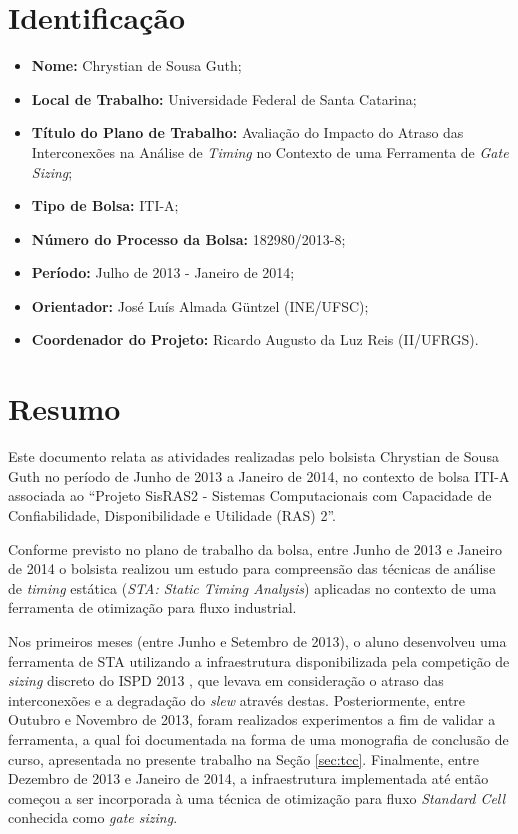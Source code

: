 \documentclass[
	12pt,				%
	openright,			%
	twoside,			%
	a4paper,			%
	english,			%
	french,				%
	spanish,			%
	brazil,				%
	]{abntex2}
\begin{document}
\section{Identificação}

\begin{itemize}
	\item \textbf{Nome:} Chrystian de Sousa Guth;
	\item \textbf{Local de Trabalho:} Universidade Federal de Santa Catarina;
	\item \textbf{Título do Plano de Trabalho:} Avaliação do Impacto do Atraso das Interconexões na Análise de \textit{Timing} no Contexto de uma Ferramenta de \textit{Gate Sizing};
	\item \textbf{Tipo de Bolsa:} ITI-A;
	\item \textbf{Número do Processo da Bolsa:} 182980/2013-8;
	\item \textbf{Período:} Julho de 2013 - Janeiro de 2014;
	\item \textbf{Orientador:} José Luís Almada Güntzel (INE/UFSC);
	\item \textbf{Coordenador do Projeto:} Ricardo Augusto da Luz Reis (II/UFRGS).
\end{itemize}

\section{Resumo}
Este documento relata as atividades realizadas pelo bolsista Chrystian de Sousa Guth no período de Junho de 2013 a Janeiro de 2014, no contexto de bolsa ITI-A associada ao ``Projeto SisRAS2 - Sistemas Computacionais com Capacidade de Confiabilidade, Disponibilidade e Utilidade (RAS) 2''.

Conforme previsto no plano de trabalho da bolsa, entre Junho de 2013 e Janeiro de 2014 o bolsista realizou um estudo para compreensão das técnicas de análise de \textit{timing} estática (\textit{STA: Static Timing Analysis}) aplicadas no contexto de uma ferramenta de otimização para fluxo industrial.

Nos primeiros meses (entre Junho e Setembro de 2013), o aluno desenvolveu uma ferramenta de STA utilizando a infraestrutura disponibilizada pela competição de \textit{sizing} discreto do ISPD 2013 \cite{Contest2013}, que levava em consideração o atraso das interconexões e a degradação do \textit{slew} através destas. Posteriormente, entre Outubro e Novembro de 2013, foram realizados experimentos a fim de validar a ferramenta, a qual foi documentada na forma de uma monografia de conclusão de curso, apresentada no presente trabalho na Seção \ref{sec:tcc}. Finalmente, entre Dezembro de 2013 e Janeiro de 2014, a infraestrutura implementada até então começou a ser incorporada à uma técnica de otimização para fluxo \textit{Standard Cell} conhecida como \textit{gate sizing}.
\end{document}
